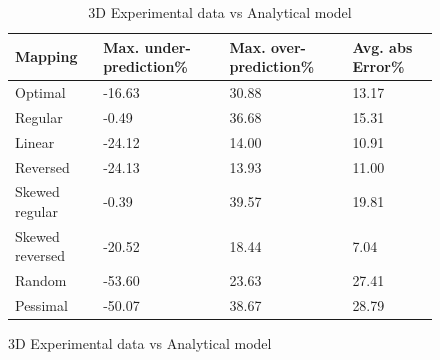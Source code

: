 \documentclass{beamer}
\begin{document}
\begin{frame}[fragile]
\begin{figure}
\caption{Analytical model effectiveness}
\begin{table}
  \caption{3D Experimental data vs Analytical model
    \label{table:data vs model 3d}}
  {\footnotesize
    \begin{tabular}{ | l | l | l | p{1.5cm} |}
    \hline
    Mapping    &    Max. under-prediction\% &    Max. over-prediction\% & Avg. abs Error\%\\ \hline
    Optimal    &         -16.63 &          30.88 &         13.17\\ \hline
    Regular    &          -0.49 &          36.68 &         15.31\\ \hline
    Linear     &         -24.12 &          14.00 &         10.91\\ \hline
    Reversed   &         -24.13 &          13.93 &         11.00\\ \hline
    Skewed regular &      -0.39 &          39.57 &         19.81\\ \hline
    Skewed reversed&     -20.52 &          18.44 &          7.04\\ \hline
    Random  &            -53.60 &          23.63 &         27.41\\ \hline
    Pessimal &           -50.07 &          38.67 &         28.79\\ \hline
    \hline
    \end{tabular}
  }
\end{table}
\end{figure}
\end{frame}
\end{document}
